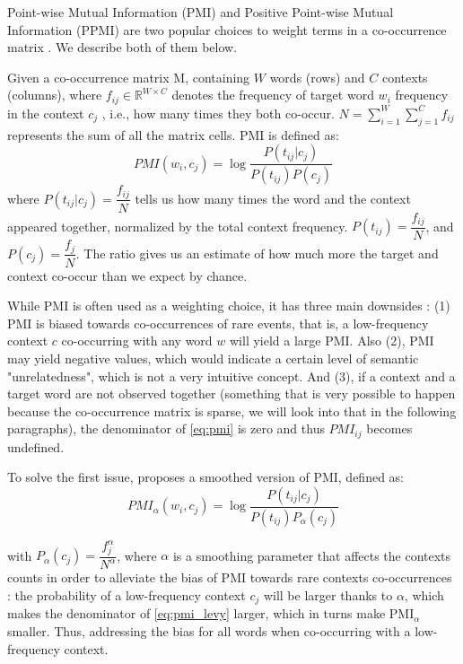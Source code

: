 Point-wise Mutual Information (PMI) \cite{Church1990} and Positive Point-wise Mutual Information (PPMI) \cite{niwa1994co} are two popular choices to weight terms in a co-occurrence matrix \cite{turney2010,JurafskyM17}. We describe both of them below.

Given a co-occurrence matrix M, containing $W$ words (rows) and $C$ contexts (columns), where $f_{ij} \in \mathbb{R}^{W\times C}$ denotes the frequency of  target word $w_i$ frequency in the context $c_j$ , i.e., how many times they both co-occur. $N=\sum_{i=1}^W\sum_{j=1}^Cf_{ij}$ represents the sum of all the matrix cells. PMI is defined as:
\begin{equation} \label{eq:pmi}
PMI(w_i,c_j) = \log\dfrac{P(t_{ij}|c_j)}{P(t_{ij})P(c_j)}
\end{equation}
where  $P(t_{ij}|c_j)=\dfrac{f_{ij}}{N}$ tells us how many times the word and the context appeared together, normalized by the total context frequency. $P(t_{ij})= \dfrac{f_{ij}}{N}$, and $P(c_j)=\dfrac{f_j}{N}$. The ratio gives us an estimate of how much more the target and context co-occur than we expect by chance.

While PMI is often used as a weighting choice, it has three main downsides \cite{JurafskyM17,levy2015improving}: (1) PMI is biased towards co-occurrences of rare events, that is, a low-frequency context $c$ co-occurring with any word $w$ will yield a large PMI. Also (2), PMI may yield negative values, which would indicate a certain level of semantic "unrelatedness", which is not a  very intuitive concept. And (3),  if a context and a target word are not observed together (something that is very possible to happen because the co-occurrence matrix is sparse, we will look into that in the following paragraphs), the denominator of \ref{eq:pmi} is zero and thus $PMI_{ij}$ becomes undefined. 

To solve the first issue, \cite{levy2015improving} proposes a smoothed version of PMI, defined as:
\begin{equation} \label{eq:pmi_levy}
PMI_\alpha(w_i,c_j) = \log\dfrac{P(t_{ij}|c_j)}{P(t_{ij})P_\alpha(c_j)}
\end{equation}

with $P_\alpha(c_j) = \dfrac{f_j^\alpha}{N^\alpha}$, where $\alpha$ is a smoothing parameter that affects the contexts counts in order to alleviate the bias of PMI towards rare contexts co-occurrences : the probability of a low-frequency context $c_j$ will be larger thanks to $\alpha$, which makes the denominator of \ref{eq:pmi_levy} larger, which in turns make PMI$_\alpha$ smaller. Thus, addressing the bias for all words when co-occurring with a low-frequency context.


